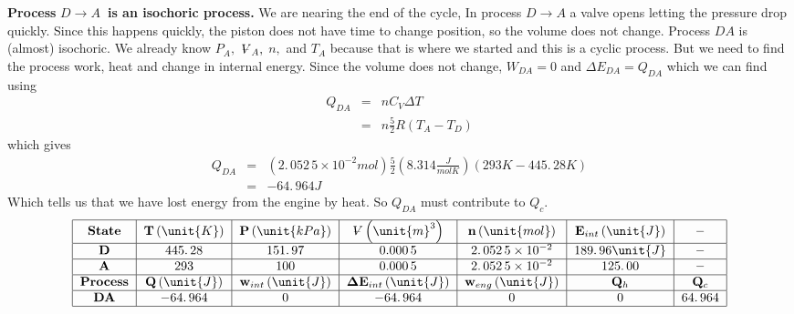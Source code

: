 \documentclass{article}
\begin{document}
\textbf{Process }$D\rightarrow A$\textbf{\ is an isochoric process.} We are
nearing the end of the cycle, In process $D\rightarrow A$ a valve opens
letting the pressure drop quickly. Since this happens quickly, the
piston does not have time to change position, so the volume does not change.
Process $DA$ is (almost) isochoric. We already know $P_{A},$ $%
\ooalign{\hfil$V$\hfil\cr\kern0.1em--\hfil\cr}%
_{A},$ $n,$ and $T_{A}$ because that is where we started and this is a
cyclic process. But we need to find the process work, heat and change in
internal energy. Since the volume does not change, $W_{DA}=0$ and $\Delta
E_{DA}=Q_{DA}$ which we can find using 
\begin{eqnarray*}
Q_{DA} &=&nC_{V}\Delta T \\
&=&n\frac{5}{2}R\left( T_{A}-T_{D}\right)
\end{eqnarray*}%
which gives%
\begin{eqnarray*}
Q_{DA} &=&\left( 2.\,052\,5\times 10^{-2}\unit{mol}\right) \frac{5}{2}\left(
8.314\frac{\unit{J}}{\unit{mol}\unit{K}}\right) \left( 293\unit{K}%
-445.\,\allowbreak 28\unit{K}\right) \\
&=&-64.\,\allowbreak 964\unit{J}
\end{eqnarray*}%
Which tells us that we have lost energy from the engine by heat. So $Q_{DA}$
must contribute to $Q_{c}.$ 
\[
\begin{tabular}{|c|c|c|c|c|c|c|}
\hline
\textbf{State} & $\mathbf{T}\left( \unit{K}\right) $ & $\mathbf{P}\left( 
\unit{kPa}\right) $ & $%
\ooalign{\hfil$V$\hfil\cr\kern0.1em--\hfil\cr}%
\left( \unit{m}^{3}\right) $ & $\mathbf{n}\left( \unit{mol}\right) $ & $%
\mathbf{E}_{int}\left( \unit{J}\right) $ & \textbf{--} \\ \hline
$\mathbf{D}$ & $445.\,\allowbreak 28$ & $151.\,\allowbreak 97$ & $0.000\,5$
& $2.\,052\,5\times 10^{-2}$ & $189.\,\allowbreak 96\unit{J}$ & \textbf{--}
\\ \hline
$\mathbf{A}$ & $293$ & $100$ & $0.000\,5$ & $2.\,052\,5\times 10^{-2}$ & $%
\allowbreak 125.\,\allowbreak 00$ & \textbf{--} \\ \hline
\textbf{Process} & $\mathbf{Q}\left( \unit{J}\right) $ & $\mathbf{w}%
_{int}\left( \unit{J}\right) $ & $\mathbf{\Delta E}_{int}\left( \unit{J}%
\right) $ & $\mathbf{w}_{eng}\left( \unit{J}\right) $ & $\mathbf{Q}_{h}$ & $%
\mathbf{Q}_{c}$ \\ \hline
$\mathbf{DA}$ & $-64.\,\allowbreak 964$ & $0$ & $-64.\,\allowbreak 964$ & $0$
& $0$ & $64.\,\allowbreak 964$ \\ \hline
\end{tabular}%
\]%
\pagebreak
\end{document}
